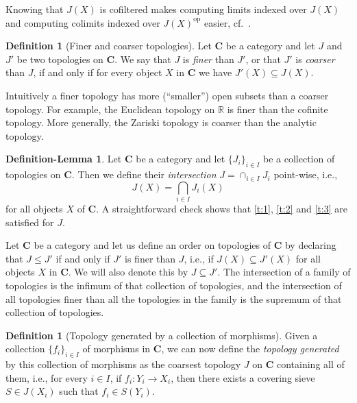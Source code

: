 \documentclass[12pt,reqno,a4paper]{amsart}
\theoremstyle{plain}
\theoremstyle{definition}
\newtheorem{defn}[thm]{Definition}
\newtheorem{defnlm}[thm]{Definition-Lemma}
\theoremstyle{remark}
\begin{document}
Knowing that $J(X)$ is cofiltered makes computing limits indexed over $J(X)$ and computing colimits indexed over $J(X)^{\mathrm{op}}$ easier, cf.~\cite[\href{https://stacks.math.columbia.edu/tag/04AX}{Tag 04AX}]{stacks-project}.

\begin{defn}[Finer and coarser topologies]
  Let $\mathbf{C}$ be a category and let $J$ and $J'$ be two topologies on $\mathbf{C}$.
  We say that $J$ is \textit{finer} than $J'$, or that $J'$ is \textit{coarser} than $J$, if and only if for every object $X$ in $\mathbf{C}$ we have $J'(X) \subseteq J(X)$.
\end{defn}

Intuitively a finer topology has more (``smaller'') open subsets than a coarser topology.
For example, the Euclidean topology on $\mathbb{R}$ is finer than the cofinite topology.
More generally, the Zariski topology is coarser than the analytic topology.

\begin{defnlm}\label{defnlm:intersection}
  Let $\mathbf{C}$ be a category and let $\{ J_{i} \}_{i \in I}$ be a collection of topologies on $\mathbf{C}$.
  Then we define their \textit{intersection} $J = \cap_{i \in I} J_{i}$ point-wise, i.e.,
  \[ J(X) = \bigcap_{i \in I} J_{i}(X) \]
  for all objects $X$ of $\mathbf{C}$.
  A straightforward check shows that \ref{t:1}, \ref{t:2} and \ref{t:3} are satisfied for $J$.
\end{defnlm}

Let $\mathbf{C}$ be a category and let us define an order on topologies of $\mathbf{C}$ by declaring that $J \leq J'$ if and only if $J'$ is finer than $J$, i.e., if $J(X) \subseteq J'(X)$ for all objects $X$ in $\mathbf{C}$.
We will also denote this by $J \subseteq J'$.
The intersection of a family of topologies is the infimum of that collection of topologies, and the intersection of all topologies finer than all the topologies in the family is the supremum of that collection of topologies.

\begin{defn}[Topology generated by a collection of morphisms]\label{defn:generated}
  Given a collection $\{ f_{i} \}_{i \in I}$ of morphisms in $\mathbf{C}$, we can now define the \textit{topology generated} by this collection of morphisms as the coarsest topology $J$ on $\mathbf{C}$ containing all of them, i.e., for every $i \in I$, if $f_{i} \colon Y_{i} \to X_{i}$, then there exists a covering sieve $S \in J(X_{i})$ such that $f_{i} \in S(Y_{i})$.
\end{defn}
\end{document}
